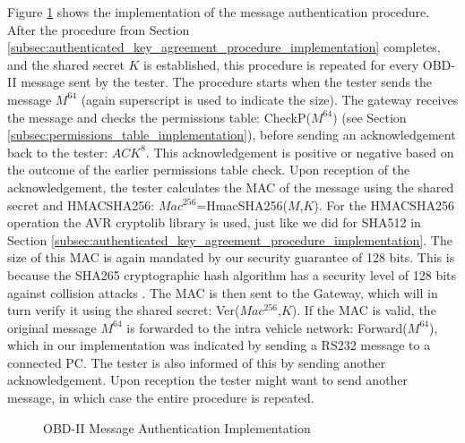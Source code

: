 Figure \ref{fig:message_authentication_implementation} shows the implementation of the message authentication procedure. After the procedure from Section \ref{subsec:authenticated_key_agreement_procedure_implementation} completes, and the shared secret $K$ is established, this procedure is repeated for every OBD-II message sent by the tester. The procedure starts when the tester sends the message $M^{64}$ (again superscript is used to indicate the size). The gateway receives the message and checks the permissions table: CheckP($M^{64}$) (see Section \ref{subsec:permissions_table_implementation}), before sending an acknowledgement back to the tester: $ACK^8$. This acknowledgement is positive or negative based on the outcome of the earlier permissions table check. Upon reception of the acknowledgement, the tester calculates the MAC of the message using the shared secret and HMAC\textunderscore SHA256: $Mac^{256}$=Hmac\textunderscore SHA256($M$,$K$). For the HMAC\textunderscore SHA256 operation the AVR cryptolib library is used, just like we did for SHA512 in Section \ref{subsec:authenticated_key_agreement_procedure_implementation}. The size of this MAC is again mandated by our security guarantee of 128 bits. This is because the SHA265 cryptographic hash algorithm has a security level of 128 bits against collision attacks \cite{SHA256Collision}. The MAC is then sent to the Gateway, which will in turn verify it using the shared secret: Ver($Mac^{256}$,$K$). If the MAC is valid, the original message $M^{64}$ is forwarded to the intra vehicle network: Forward($M^{64}$), which in our implementation was indicated by sending a RS232 message to a connected PC. The tester is also informed of this by sending another acknowledgement. Upon reception the tester might want to send another message, in which case the entire procedure is repeated. 

\begin{figure}[h]
	\centering
	\caption{OBD-II Message Authentication Implementation}
	\label{fig:message_authentication_implementation}
\end{figure}

